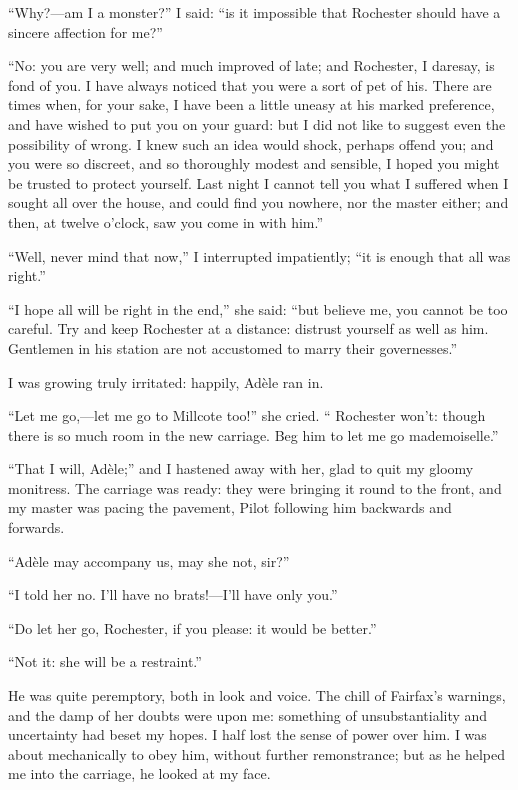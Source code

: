 \enquote{Why?---am I a monster?} I said: \enquote{is it impossible that
\Mr{} Rochester should have a sincere affection for me?}

\enquote{No: you are very well; and much improved of late; and \Mr{}
 Rochester, I daresay, is fond of you.  I have always noticed that you
were a sort of pet of his.  There are times when, for your sake, I have
been a little uneasy at his marked preference, and have wished to put
you on your guard: but I did not like to suggest even the possibility of
wrong.  I knew such an idea would shock, perhaps offend you; and you
were so discreet, and so thoroughly modest and sensible, I hoped you
might be trusted to protect yourself.  Last night I cannot tell you what
I suffered when I sought all over the house, and could find you nowhere,
nor the master either; and then, at twelve o'clock, saw you come in with
him.}

\enquote{Well, never mind that now,} I interrupted impatiently;
\enquote{it is enough that all was right.}

\enquote{I hope all will be right in the end,} she said: \enquote{but
believe me, you cannot be too careful.  Try and keep \Mr{} Rochester at a
distance: distrust yourself as well as him.  Gentlemen in his station
are not accustomed to marry their governesses.}

I was growing truly irritated: happily, Adèle ran in.

\enquote{Let me go,---let me go to Millcote too!} she cried. 
\enquote{\Mr{} Rochester won't: though there is so much room in the new
carriage.  Beg him to let me go mademoiselle.}

\enquote{That I will, Adèle;} and I hastened away with her, glad to quit
my gloomy monitress.  The carriage was ready: they were bringing it
round to the front, and my master was pacing the pavement, Pilot
following him backwards and forwards.

\enquote{Adèle may accompany us, may she not, sir?}

\enquote{I told her no.  I'll have no brats!---I'll have only you.}

\enquote{Do let her go, \Mr{} Rochester, if you please: it would be
better.}

\enquote{Not it: she will be a restraint.}

He was quite peremptory, both in look and voice.  The chill of \Mrs{}
Fairfax's warnings, and the damp of her doubts were upon me: something
of unsubstantiality and uncertainty had beset my hopes.  I half lost the
sense of power over him.  I was about mechanically to obey him, without
further remonstrance; but as he helped me into the carriage, he looked
at my face.

